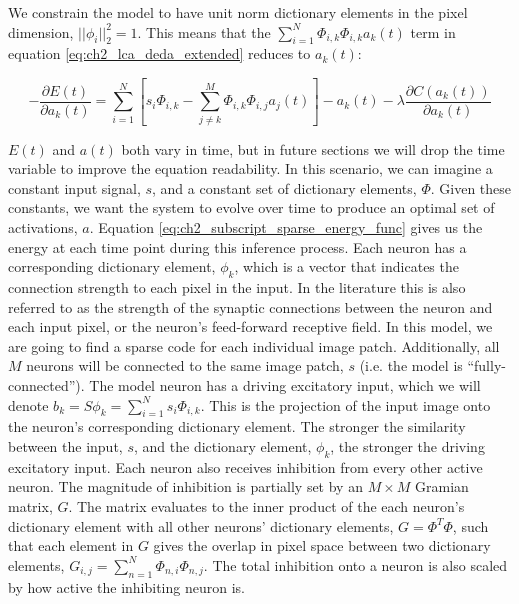 We constrain the model to have unit norm dictionary elements in the pixel dimension, $||\phi_{i}||_2^2 = 1$. This means that the $\sum_{i=1}^{N}\Phi_{i,k}\Phi_{i,k}a_{k}(t)$ term in equation \eqref{eq:ch2_lca_deda_extended} reduces to $a_k(t)$:

\begin{equation}\label{eq:ch2_lca_deda}
    -\frac{\partial E(t)}{\partial a_{k}(t)} =
    \sum\limits_{i=1}^{N} \left[ s_{i} \Phi_{i,k} -
    \sum\limits_{j \neq k}^{M} \Phi_{i,k} \Phi_{i,j} a_{j}(t) \right] - a_{k}(t) -
    \lambda \frac{\partial C(a_{k}(t))}{\partial a_{k}(t)}
\end{equation}

$E(t)$ and $a(t)$ both vary in time, but in future sections we will drop the time variable to improve the equation readability. In this scenario, we can imagine a constant input signal, $s$, and a constant set of dictionary elements, $\Phi$. Given these constants, we want the system to evolve over time to produce an optimal set of activations, $a$. Equation \eqref{eq:ch2_subscript_sparse_energy_func} gives us the energy at each time point during this inference process. Each neuron has a corresponding dictionary element, $\phi_{k}$, which is a vector that indicates the connection strength to each pixel in the input. In the literature this is also referred to as the strength of the synaptic connections between the neuron and each input pixel, or the neuron's feed-forward receptive field. In this model, we are going to find a sparse code for each individual image patch. Additionally, all $M$ neurons will be connected to the same image patch, $s$ (i.e. the model is ``fully-connected''). The model neuron has a driving excitatory input, which we will denote $b_{k} = S\phi_{k} = \sum_{i=1}^{N}s_{i} \Phi_{i,k}$. This is the projection of the input image onto the neuron's corresponding dictionary element. The stronger the similarity between the input, $s$, and the dictionary element, $\phi_{k}$, the stronger the driving excitatory input. Each neuron also receives inhibition from every other active neuron. The magnitude of inhibition is partially set by an $M \times M$ Gramian matrix, $G$. The matrix evaluates to the inner product of the each neuron's dictionary element with all other neurons' dictionary elements, $G = \Phi^T\Phi$, such that each element in $G$ gives the overlap in pixel space between two dictionary elements, $G_{i,j} = \sum\limits_{n=1}^{N} \Phi_{n,i}\Phi_{n,j}$. The total inhibition onto a neuron is also scaled by how active the inhibiting neuron is.

